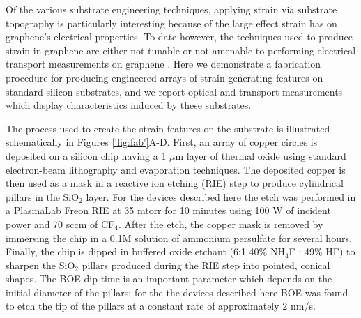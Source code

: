 \documentclass[%
 aip,
 apl,%
 amsmath,amssymb,
 reprint,%
]{revtex4-1}
\begin{document}
Of the various substrate engineering techniques, applying strain via substrate topography is particularly interesting
because of the large effect strain has on graphene's electrical 
properties\cite{guinea2010energy, pereira2009strain, levy2010strain}. 
To date however, the techniques used to produce strain in graphene are either not tunable\cite{levy2010strain}
or not amenable to performing electrical transport measurements on graphene
\cite{Tomori2011, mohiuddin2009uniaxial, ni2008uniaxial, gill2015mechanical}.
Here we demonstrate a fabrication procedure for producing engineered arrays of strain-generating features on standard silicon
substrates, and we report optical and transport measurements which display characteristics induced by these substrates.


The process used to create the strain features on the substrate is illustrated schematically in Figures \ref{'fig:fab'}A-D.
First, an array of copper circles is deposited on a silicon chip having a 1 $\mu$m layer of thermal oxide using standard 
electron-beam lithography and evaporation techniques. The deposited copper is then used as a mask in a reactive ion etching 
(RIE) step to produce cylindrical pillars in the SiO$_2$ layer. For the devices described here the etch was performed in 
a PlasmaLab Freon RIE at 35 mtorr for 10 minutes 
using 100 W of incident power and 70 sccm of CF$_4$. After the etch, the copper mask is removed by immersing the chip 
in a 0.1M solution of ammonium persulfate for several hours. Finally, the chip is dipped in buffered oxide etchant 
(6:1 40\% NH$_4$F : 49\% HF) to sharpen the SiO$_2$ pillars produced during the RIE step into pointed, conical shapes. 
The BOE dip time is an important parameter which depends on the initial diameter of the pillars; for the the devices
described here BOE was found to etch the tip of the pillars at a constant rate of approximately 2 nm/s. 
\end{document}
